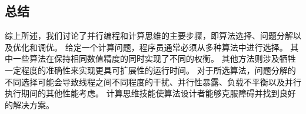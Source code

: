 \subsection{总结}
综上所述，我们讨论了并行编程和计算思维的主要步骤，即算法选择、问题分解以及优化和调优。 
给定一个计算问题，程序员通常必须从多种算法中进行选择。 其中一些算法在保持相同数值精度的同时实现了不同的权衡。 
其他方法则涉及牺牲一定程度的准确性来实现更具可扩展性的运行时间。 
对于所选算法，问题分解的不同选择可能会导致线程之间不同程度的干扰、并行性暴露、负载不平衡以及并行执行期间的其他性能考虑。 
计算思维技能使算法设计者能够克服障碍并找到良好的解决方案。